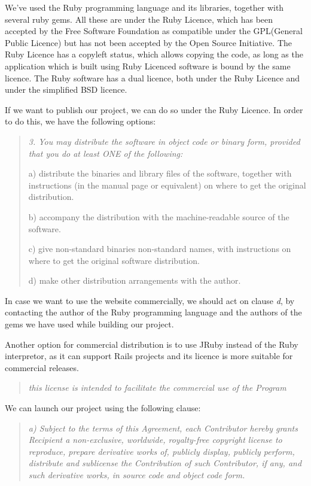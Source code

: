 \documentclass[a4wide, 11pt]{article}
\newenvironment{italicquotes}
{\begin{quote}\itshape\small}
{\end{quote}}
\begin{document}
We've used the Ruby programming language and its libraries, together with
several ruby gems. All these are under the Ruby Licence, which has been
accepted by the Free Software Foundation as compatible under the GPL(General
Public Licence)\cite{GNUlicence} but has not been accepted by the Open Source
Initiative. The Ruby Licence has a copyleft status, which allows copying the
code, as long as the application which is built using Ruby Licenced software is
bound by the same licence. The Ruby software has a dual licence, both under the
Ruby Licence and under the simplified BSD licence.

If we want to publish our project, we can do so under the Ruby Licence.
In order to do this, we have the following options:

\begin{italicquotes}
3. You may distribute the software in object code or binary form,
   provided that you do at least ONE of the following:

a) distribute the binaries and library files of the software,
together with instructions (in the manual page or equivalent)
on where to get the original distribution.

b) accompany the distribution with the machine-readable source of
the software.

c) give non-standard binaries non-standard names, with
instructions on where to get the original software distribution.

d) make other distribution arrangements with the author.
     \cite{Rubylicence}
\end{italicquotes}

In case we want to use the website commercially, we should act on clause 
{\it d}, by contacting the author of the Ruby programming language and the
authors of the gems we have used while building our project.

Another option for commercial distribution is to use JRuby instead of the Ruby
interpretor, as it can support Rails projects and its licence is more suitable
for commercial releases.

\begin{italicquotes}
this license is intended to facilitate the commercial use of the Program
\cite{JRubylicence}
\end{italicquotes}

We can launch our project using the following clause:

\begin{italicquotes}
a) Subject to the terms of this Agreement, each Contributor hereby grants
Recipient a non-exclusive, worldwide, royalty-free copyright license to
reproduce, prepare derivative works of, publicly display, publicly perform,
distribute and sublicense the Contribution of such Contributor, if any, and
such derivative works, in source code and object code form.
\cite{JRubylicence}
\end{italicquotes}
\end{document}
